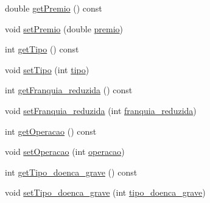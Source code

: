 \begin{DoxyCompactItemize}
\item 
double \hyperlink{class_produto_a5edbfd3bad58f247d3505ee10ccba1ea}{get\+Premio} () const
\item 
void \hyperlink{class_produto_ae516599e859fa6ef3e8340b4a8d51569}{set\+Premio} (double \hyperlink{class_produto_ae9f4beb63c585a39767d4206cece7810}{premio})
\item 
int \hyperlink{class_produto_ac8952f93cd5f2887e393664426b1dbfd}{get\+Tipo} () const
\item 
void \hyperlink{class_produto_a504d2bf1f04d4174a3f9ce7bd2290e3b}{set\+Tipo} (int \hyperlink{class_produto_aace691096fd97d7ca03f5d9fab0270f7}{tipo})
\item 
int \hyperlink{class_produto_a3159458124c68ace89e583f97f6039c8}{get\+Franquia\+\_\+reduzida} () const
\item 
void \hyperlink{class_produto_a35f48a657e128af8191285fc05ea6223}{set\+Franquia\+\_\+reduzida} (int \hyperlink{class_produto_ac0793fa6348f5c77a66fd5cf916d964b}{franquia\+\_\+reduzida})
\item 
int \hyperlink{class_produto_aa2439688c906f40ceba801416997ee52}{get\+Operacao} () const
\item 
void \hyperlink{class_produto_aa167285c5ec052160888e1ece8d128bf}{set\+Operacao} (int \hyperlink{class_produto_a096269e399eb77578de837e329d3a052}{operacao})
\item 
int \hyperlink{class_produto_a8dc442d4a281ea7c5b3908c6bcfc0569}{get\+Tipo\+\_\+doenca\+\_\+grave} () const
\item 
void \hyperlink{class_produto_a0cd741b44502e595618500d4059f8b0e}{set\+Tipo\+\_\+doenca\+\_\+grave} (int \hyperlink{class_produto_a2b89a8682a290751479f50c4c1ea1fa5}{tipo\+\_\+doenca\+\_\+grave})
\end{DoxyCompactItemize}
